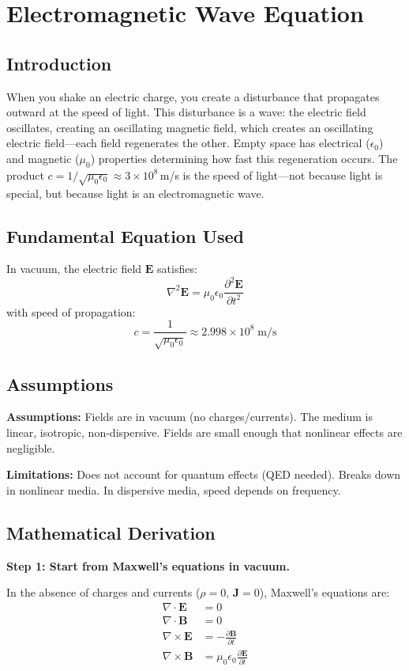 \chapter{Electromagnetic Wave Equation}

\section*{Introduction}

When you shake an electric charge, you create a disturbance that propagates outward at the speed of light. This disturbance is a wave: the electric field oscillates, creating an oscillating magnetic field, which creates an oscillating electric field---each field regenerates the other. Empty space has electrical ($\epsilon_0$) and magnetic ($\mu_0$) properties determining how fast this regeneration occurs. The product $c = 1/\sqrt{\mu_0 \epsilon_0} \approx 3 \times 10^8$\,m/s is the speed of light---not because light is special, but because light is an electromagnetic wave.
\section*{Fundamental Equation Used}

In vacuum, the electric field $\mathbf{E}$ satisfies:
\[
\nabla^2 \mathbf{E} = \mu_0 \epsilon_0 \frac{\partial^2 \mathbf{E}}{\partial t^2}
\]
with speed of propagation:
\[
c = \frac{1}{\sqrt{\mu_0 \epsilon_0}} \approx 2.998 \times 10^8 \;\text{m/s}
\]
\section*{Assumptions}

\textbf{Assumptions:} Fields are in vacuum (no charges/currents). The medium is linear, isotropic, non-dispersive. Fields are small enough that nonlinear effects are negligible.


\textbf{Limitations:} Does not account for quantum effects (QED needed). Breaks down in nonlinear media. In dispersive media, speed depends on frequency.


\section*{Mathematical Derivation}

\textbf{Step 1: Start from Maxwell's equations in vacuum.}

In the absence of charges and currents ($\rho = 0$, $\mathbf{J} = 0$), Maxwell's equations are:
\begin{align}
\nabla \cdot \mathbf{E} &= 0 \\
\nabla \cdot \mathbf{B} &= 0 \\
\nabla \times \mathbf{E} &= -\frac{\partial \mathbf{B}}{\partial t} \\
\nabla \times \mathbf{B} &= \mu_0\epsilon_0\frac{\partial \mathbf{E}}{\partial t}
\end{align}

